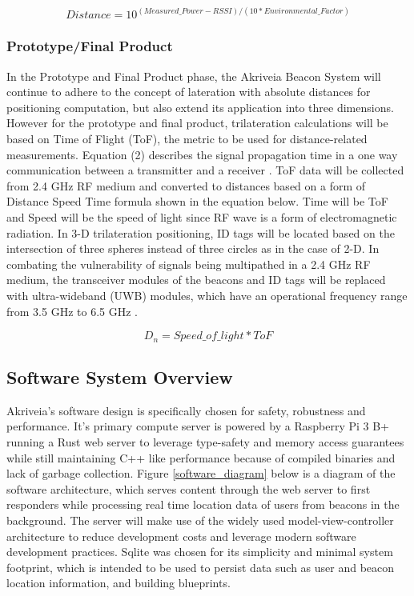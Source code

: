 \begin{equation}
    Distance = 10^{(Measured\_Power - RSSI)/(10*Environmental\_Factor)}
\end{equation}

\subsubsection{Prototype/Final Product}
In the Prototype and Final Product phase, the Akriveia Beacon System will continue to adhere to the concept of lateration with absolute distances for positioning computation, but also extend its application into three dimensions. However for the prototype and final product,  trilateration calculations will be based on Time of Flight (ToF), the metric to be used for distance-related measurements. Equation (2) describes the signal propagation time in a one way communication between a transmitter and a receiver \cite{R6}. ToF data will be collected from 2.4 GHz RF medium and converted to distances based on a form of Distance Speed Time formula shown in the equation below. Time will be ToF and Speed will be the speed of light since RF wave is a form of electromagnetic radiation. In 3-D trilateration positioning, ID tags will be located based on the intersection of three spheres instead of three circles as in the case of 2-D. In combating the vulnerability of signals being multipathed in a 2.4 GHz RF medium, the transceiver modules of the beacons and ID tags will be replaced with ultra-wideband (UWB) modules, which have an operational frequency range from 3.5 GHz to 6.5 GHz \cite{R4}.

\begin{equation}
    D_n = Speed\_of\_light * ToF
\end{equation}

\break

\subsection{Software System Overview}
Akriveia's software design is specifically chosen for safety, robustness and performance. It's primary compute server is powered by a Raspberry Pi 3 B+ running a Rust web server to leverage type-safety and memory access guarantees while still maintaining C++ like performance because of compiled binaries and lack of garbage collection. Figure \ref{software_diagram} below is a diagram of the software architecture, which serves content through the web server to first responders while processing real time location data of users from beacons in the background. The server will make use of the widely used model-view-controller architecture to reduce development costs and leverage modern software development practices. Sqlite was chosen for its simplicity and minimal system footprint, which is intended to be used to persist data such as user and beacon location information, and building blueprints.

